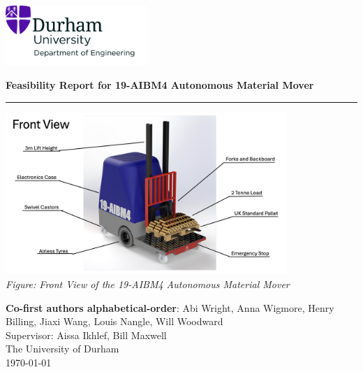 \documentclass[12pt]{article}
\begin{document}


 
\begin{titlepage}
\centering
\includegraphics[width=0.4\textwidth]{UoD_Engineering.jpg} \\
\vspace{20mm}

{\LARGE \textbf{Feasibility Report for 19-AIBM4 Autonomous Material Mover}} \\[10pt]

\vspace{5mm}\hrule\vspace{15mm}

\includegraphics[width=0.8\textwidth]{Screenshot 2024-11-14 at 17.52.59.png}  \\  
\vspace{5mm}
\textit{Figure: Front View of the 19-AIBM4 Autonomous Material Mover} \\

\vspace{20mm}

{\large \textbf{Co-first authors alphabetical-order}: Abi Wright, Anna Wigmore, Henry Billing, Jiaxi Wang, Louis Nangle, Will Woodward} \\ \vspace{2mm}
{Supervisor: Aissa Ikhlef, Bill Maxwell} \\[10pt]
{\small The University of Durham \\ \today}
\end{titlepage}
\end{document}

